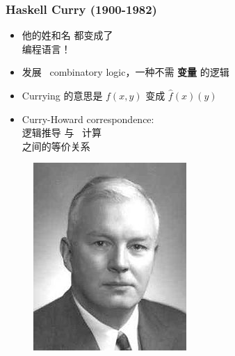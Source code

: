 \documentclass[17pt]{beamer}
\begin{document}
\begin{frame}
\frametitle{Haskell Curry (1900-1982)}
\fontsize{16}{16}\selectfont
\begin{minipage}[t]{0.62\linewidth}
	\begin{itemize}
		\item 他的姓和名 都变成了 \\编程语言！
		\item 发展 {\color{red} \ combinatory logic}，一种不需 \textbf{变量} 的逻辑
		\item Currying 的意思是 $f(x,y)$ 变成 $\hat{f}(x)(y)$
		\item Curry-Howard correspondence: \\
			{\color{red}逻辑推导} 与 {\color{red}\ 计算} \\
			之间的等价关系
	\end{itemize}
\end{minipage}
\hfill
\begin{minipage}[t]{0.35\linewidth}
	\begin{figure}[H]
		\includegraphics[scale=0.5]{Curry.jpg}
	\end{figure}
\end{minipage}
\end{frame}
\end{document}
